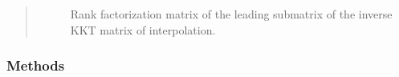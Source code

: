 \documentclass[letterpaper,10pt,english]{sphinxmanual}
\begin{document}
\begin{fulllineitems}
\begin{quote}
\begin{description}
\begin{description}
\item[{}] \leavevmode
\sphinxAtStartPar
Rank factorization matrix of the leading  submatrix of the inverse KKT matrix of interpolation.

\end{description}

\end{description}\end{quote}
\subsubsection*{Methods}


\begin{savenotes}\sphinxatlongtablestart\begin{longtable}[c]{}
\hline

\endfirsthead

%
{}\\
\hline

\endhead

\hline
{}\\
\endfoot

\endlastfoot


\end{longtable}
\end{savenotes}
\end{fulllineitems}
\end{document}
